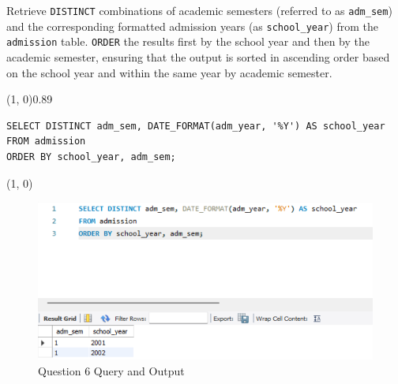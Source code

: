 
Retrieve \texttt{DISTINCT} combinations of academic semesters (referred to as \texttt{adm\_sem}) and the corresponding formatted admission years (as \texttt{school\_year}) from the \texttt{admission} table. \texttt{ORDER} the results first by the school year and then by the academic semester, ensuring that the output is sorted in ascending order based on the school year and within the same year by academic semester.
\vspace{\baselineskip}

\sol{}
\noindent\line(1, 0){0.89\linewidth}
\begin{verbatim}
SELECT DISTINCT adm_sem, DATE_FORMAT(adm_year, '%Y') AS school_year
FROM admission
ORDER BY school_year, adm_sem;
\end{verbatim}
\noindent\line(1, 0){\linewidth}

\begin{figure}[H]
    \centering
    \includegraphics[width=0.7\linewidth]{images/q6.png}
    \caption{Question 6 Query and Output}
\end{figure}
